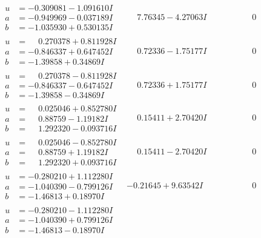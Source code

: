 \documentclass[1p]{elsarticle_modified}
\theoremstyle{definition}
\begin{document}
$$\begin{array}{c|c|c}
\begin{aligned}
u &= -0.309081 - 1.091610 I \\
a &= -0.949969 - 0.037189 I \\
b &= -1.035930 + 0.530135 I\end{aligned}
 & \phantom{-}7.76345 - 4.27063 I & \phantom{-0.000000 } 0 \\ \hline\begin{aligned}
u &= \phantom{-}0.270378 + 0.811928 I \\
a &= -0.846337 + 0.647452 I \\
b &= -1.39858 + 0.34869 I\end{aligned}
 & \phantom{-}0.72336 - 1.75177 I & \phantom{-0.000000 } 0 \\ \hline\begin{aligned}
u &= \phantom{-}0.270378 - 0.811928 I \\
a &= -0.846337 - 0.647452 I \\
b &= -1.39858 - 0.34869 I\end{aligned}
 & \phantom{-}0.72336 + 1.75177 I & \phantom{-0.000000 } 0 \\ \hline\begin{aligned}
u &= \phantom{-}0.025046 + 0.852780 I \\
a &= \phantom{-}0.88759 - 1.19182 I \\
b &= \phantom{-}1.292320 - 0.093716 I\end{aligned}
 & \phantom{-}0.15411 + 2.70420 I & \phantom{-0.000000 } 0 \\ \hline\begin{aligned}
u &= \phantom{-}0.025046 - 0.852780 I \\
a &= \phantom{-}0.88759 + 1.19182 I \\
b &= \phantom{-}1.292320 + 0.093716 I\end{aligned}
 & \phantom{-}0.15411 - 2.70420 I & \phantom{-0.000000 } 0 \\ \hline\begin{aligned}
u &= -0.280210 + 1.112280 I \\
a &= -1.040390 - 0.799126 I \\
b &= -1.46813 + 0.18970 I\end{aligned}
 & -0.21645 + 9.63542 I & \phantom{-0.000000 } 0 \\ \hline\begin{aligned}
u &= -0.280210 - 1.112280 I \\
a &= -1.040390 + 0.799126 I \\
b &= -1.46813 - 0.18970 I\end{aligned}

\end{array}$$
\end{document}
